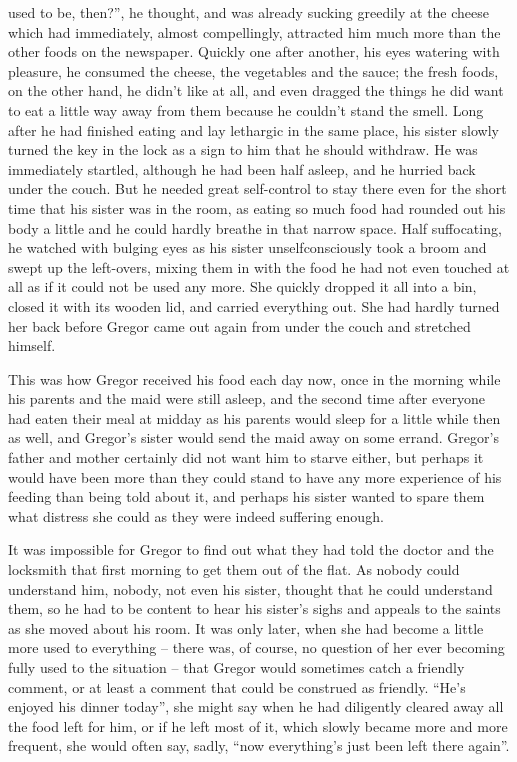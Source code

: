 used to be, then?”, he thought, and was already sucking greedily at the
cheese which had immediately, almost compellingly, attracted him much
more than the other foods on the newspaper. Quickly one after another,
his eyes watering with pleasure, he consumed the cheese, the vegetables
and the sauce; the fresh foods, on the other hand, he didn’t like at
all, and even dragged the things he did want to eat a little way away
from them because he couldn’t stand the smell. Long after he had
finished eating and lay lethargic in the same place, his sister slowly
turned the key in the lock as a sign to him that he should withdraw. He
was immediately startled, although he had been half asleep, and he
hurried back under the couch. But he needed great self-control to stay
there even for the short time that his sister was in the room, as
eating so much food had rounded out his body a little and he could
hardly breathe in that narrow space. Half suffocating, he watched with
bulging eyes as his sister unselfconsciously took a broom and swept up
the left-overs, mixing them in with the food he had not even touched at
all as if it could not be used any more. She quickly dropped it all
into a bin, closed it with its wooden lid, and carried everything out.
She had hardly turned her back before Gregor came out again from under
the couch and stretched himself.

This was how Gregor received his food each day now, once in the morning
while his parents and the maid were still asleep, and the second time
after everyone had eaten their meal at midday as his parents would
sleep for a little while then as well, and Gregor’s sister would send
the maid away on some errand. Gregor’s father and mother certainly did
not want him to starve either, but perhaps it would have been more than
they could stand to have any more experience of his feeding than being
told about it, and perhaps his sister wanted to spare them what
distress she could as they were indeed suffering enough.

It was impossible for Gregor to find out what they had told the doctor
and the locksmith that first morning to get them out of the flat. As
nobody could understand him, nobody, not even his sister, thought that
he could understand them, so he had to be content to hear his sister’s
sighs and appeals to the saints as she moved about his room. It was
only later, when she had become a little more used to everything – there
was, of course, no question of her ever becoming fully used to the
situation – that Gregor would sometimes catch a friendly comment, or at
least a comment that could be construed as friendly. “He’s enjoyed his
dinner today”, she might say when he had diligently cleared away all
the food left for him, or if he left most of it, which slowly became
more and more frequent, she would often say, sadly, “now everything’s
just been left there again”.

